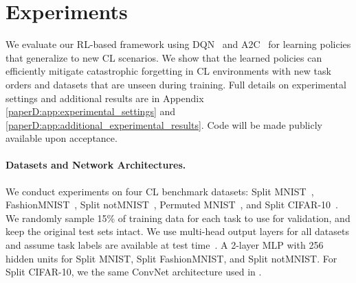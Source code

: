 
\section{Experiments}\label{paperD:sec:experiments}


We evaluate our RL-based framework using DQN~ and A2C~ for learning policies that generalize to new CL scenarios. We show that the learned policies can efficiently mitigate catastrophic forgetting in CL environments with new task orders and datasets that are unseen during training. Full details on experimental settings and additional results are in Appendix \ref{paperD:app:experimental_settings} and \ref{paperD:app:additional_experimental_results}. Code will be made publicly available upon acceptance. 


\vspace{-2mm}
\paragraph{Datasets and Network Architectures.} We conduct experiments on four CL benchmark datasets: Split MNIST~, FashionMNIST~, Split notMNIST~, Permuted MNIST~, and Split CIFAR-10~. We randomly sample 15\% of training data for each task to use for validation, and keep the original test sets intact. 
We use multi-head output layers for all datasets and assume task labels are available at test time~. A 2-layer MLP with 256 hidden units for Split MNIST, Split FashionMNIST, and Split notMNIST. For Split CIFAR-10, we the same ConvNet architecture used in .

\vspace{-2mm}
